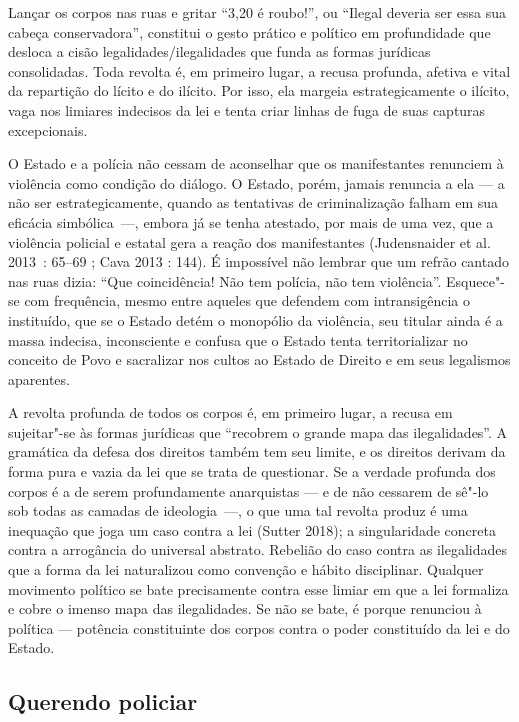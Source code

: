 Lançar os corpos nas ruas e gritar ``3,20 é roubo!'', ou ``Ilegal
deveria ser essa sua cabeça conservadora'', constitui o gesto prático e
político em profundidade que desloca a cisão legalidades/ilegalidades
que funda as formas jurídicas consolidadas. Toda revolta é, em primeiro
lugar, a recusa profunda, afetiva e vital da repartição do lícito e do
ilícito. Por isso, ela margeia estrategicamente o ilícito, vaga nos
limiares indecisos da lei e tenta criar linhas de fuga de suas capturas
excepcionais.

O Estado e a polícia não cessam de aconselhar que os manifestantes
renunciem à violência como condição do diálogo. O Estado, porém, jamais
renuncia a ela --- a não ser estrategicamente, quando as tentativas de
criminalização falham em sua eficácia simbólica~---, embora já se tenha
atestado, por mais de uma vez, que a violência policial e estatal gera a
reação dos manifestantes (Judensnaider et al. 2013~: 65--69 ; Cava 2013 :
144). É impossível não lembrar que um refrão cantado nas ruas dizia:
``Que coincidência! Não tem polícia, não tem violência''. Esquece"-se com
frequência, mesmo entre aqueles que defendem com intransigência o
instituído, que se o Estado detém o monopólio da violência, seu titular
ainda é a massa indecisa, inconsciente e confusa que o Estado tenta
territorializar no conceito de Povo e sacralizar nos cultos ao Estado de
Direito e em seus legalismos aparentes.

A revolta profunda de todos os corpos é, em primeiro lugar, a recusa em
sujeitar"-se às formas jurídicas que ``recobrem o grande mapa das
ilegalidades''. A gramática da defesa dos direitos também tem seu
limite, e os direitos derivam da forma pura e vazia da lei que se trata
de questionar. Se a verdade profunda dos corpos é a de serem
profundamente anarquistas --- e de não cessarem de sê"-lo sob todas as
camadas de ideologia~---, o que uma tal revolta produz é uma inequação
que joga um caso contra a lei (Sutter 2018); a singularidade concreta
contra a arrogância do universal abstrato. Rebelião do caso contra as
ilegalidades que a forma da lei naturalizou como convenção e hábito
disciplinar. Qualquer movimento político se bate precisamente contra
esse limiar em que a lei formaliza e cobre o imenso mapa das
ilegalidades. Se não se bate, é porque renunciou à política --- potência
constituinte dos corpos contra o poder constituído da lei e do Estado.

\subsection{Querendo policiar}

